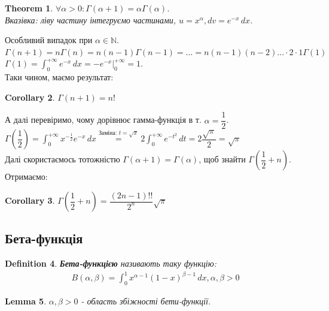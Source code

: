\documentclass[a4paper, 10pt]{article}
\def\huge{\displaystyle}
\theoremstyle{theoremdd}
\newtheorem{theorem}{Theorem}[subsection]
\theoremstyle{theoremdd}
\theoremstyle{theoremdd}
\newtheorem{definition}[theorem]{Definition}
\theoremstyle{theoremdd}
\theoremstyle{theoremdd}
\theoremstyle{theoremdd}
\theoremstyle{theoremdd}
\theoremstyle{theoremdd}
\newtheorem{lemma}[theorem]{Lemma}
\theoremstyle{theoremdd}
\newtheorem{corollary}[theorem]{Corollary}
\begin{document}
\begin{theorem}
$\forall \alpha > 0: \Gamma (\alpha+1) = \alpha \Gamma (\alpha)$.\\
\textit{Вказівка: ліву частину інтегруємо частинами}, $u = x^{\alpha}, dv = e^{-x}\,dx$.
\end{theorem}

Особливий випадок при $\alpha \in \mathbb{N}$.\\
$\Gamma(n+1) = n \Gamma (n) = n(n-1) \Gamma (n-1) = \dots = n(n-1)(n-2)\dots \cdot 2 \cdot 1 \Gamma (1)$\\
$\Gamma(1) = \huge \int_0^{+\infty} e^{-x}\,dx = -e^{-x} \Big|_{0}^{+\infty} = 1$.\\
Таки чином, маємо результат:
\begin{corollary}
$\Gamma(n+1) = n!$
\end{corollary}
А далі перевіримо, чому дорівнює гамма-функція в т. $\alpha = \dfrac{1}{2}$.\\
$\Gamma \left( \dfrac{1}{2} \right) = \huge \int_0^{+\infty} x^{-\frac{1}{2}}e^{-x}\,dx \overset{\textrm{Заміна: } t = \sqrt{x}}{=} 2 \huge \int_0^{+\infty} e^{-t^2}\,dt = 2 \dfrac{\sqrt{\pi}}{2} = \sqrt{\pi}$\\
Далі скористаємось тотожністю $\Gamma(\alpha+1) = \Gamma(\alpha)$, щоб знайти $\Gamma \left( \dfrac{1}{2} + n \right)$. Отримаємо:
\begin{corollary}
$\Gamma \left( \dfrac{1}{2} + n \right) = \dfrac{(2n-1)!!}{2^n} \sqrt{\pi}$
\end{corollary}

\subsection{Бета-функція}
\begin{definition}
\textbf{Бета-функцією} називають таку функцію:
\begin{align*}
B(\alpha,\beta) = \int_0^1 x^{\alpha-1} (1-x)^{\beta-1}\,dx, \alpha,\beta>0
\end{align*}
\end{definition}

\begin{lemma}
$\alpha, \beta >0$ - область збіжності бети-функції.
\end{lemma}
\end{document}

